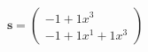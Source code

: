 \documentclass[preview]{standalone}
\begin{document}
\begin{align*}
\mathbf{s} = \begin{pmatrix}-1 + 1x^{3} \\ -1 + 1x^{1} + 1x^{3}\end{pmatrix}
\end{align*}
\end{document}
